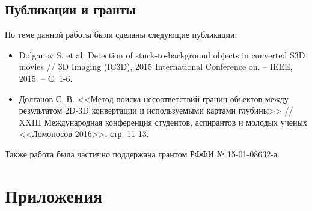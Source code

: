 \documentclass[14pt, a4paper]{extarticle}
\begin{document}
\subsection{Публикации и гранты}

По теме данной работы были сделаны следующие публикации:

\begin{itemize}
	\item Dolganov S. et al. Detection of stuck-to-background objects in converted S3D movies // 3D Imaging (IC3D), 2015 International Conference on. – IEEE, 2015. – С. 1-6.
	\item Долганов С. В. <<Метод поиска несоответствий границ объектов между результатом 2D-3D конвертации и используемыми картами глубины>> // XXIII Международная конференция студентов, аспирантов и молодых ученых <<Ломоносов-2016>>, стр. 11-13.
\end{itemize}

Также работа была частично поддержана грантом РФФИ № 15-01-08632-а.

\newpage
\section{Приложения}

\newpage


\end{document}
